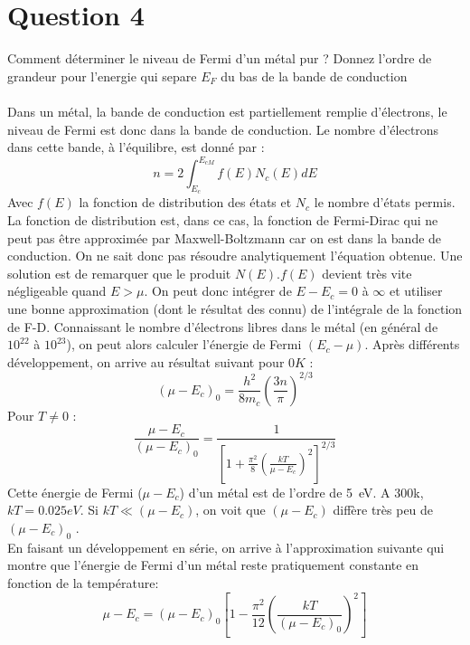\section{Question 4}
Comment déterminer le niveau de Fermi d’un métal pur ?  Donnez l'ordre de grandeur pour l'energie qui separe $E_F$ du bas de la bande de conduction\\
\hbox{}
\\
Dans un métal, la bande de conduction est partiellement remplie d'électrons, le niveau de Fermi est donc dans la bande de conduction. Le nombre d'électrons dans cette bande, à l'équilibre, est donné par :
\begin{equation}
n=2\int_{E_c}^{E_{cM}} f(E)N_c(E)dE 
\end{equation} 
Avec $f(E)$ la fonction de distribution des états et $N_c$ le nombre d'états permis. La fonction de distribution est, dans ce cas, la fonction de Fermi-Dirac qui ne peut pas être approximée par Maxwell-Boltzmann car on est dans la bande de conduction. On ne sait donc pas résoudre analytiquement l'équation obtenue. Une solution est de remarquer que le produit $N(E).f(E)$ devient très vite négligeable quand $E>\mu$. On peut donc intégrer de  $E-E_c = 0$ à $\infty$ et utiliser une bonne approximation (dont le résultat des connu) de l'intégrale de la fonction de F-D.%
Connaissant le nombre d'électrons libres dans le métal (en général de $10^{22}$ à $10^{23}$), on peut alors calculer l'énergie de Fermi $(E_c-\mu)$. Après différents développement, on arrive au résultat suivant pour $0K$ :
\begin{equation}
(\mu -E_c)_0=\frac{h^2}{8m_c} (\frac{3n}{\pi})^{2/3}
\end{equation}
Pour $T \neq 0$ :
\begin{equation}
\frac{\mu -E_c}{(\mu - E_c)_0} = \frac{1}{\left[ 1 + \frac{\pi^2}{8} \left( \frac{kT}{\mu - E_c} \right)^2 \right]^{2/3}}
\end{equation}
Cette énergie de Fermi ($\mu -E_c$) d'un métal est de l'ordre de 5~eV. A 300k, $kT = 0.025 eV$. Si $kT \ll (\mu - E_c)$, on voit que $(\mu - E_c)$ diffère très peu de $(\mu - E_c)_0$ . \\

En faisant un développement en série, on arrive à l'approximation suivante qui montre que l'énergie de Fermi d'un métal reste pratiquement constante en fonction de la température:
$$ \mu - E_c = (\mu - E_c)_0 \left[ 1 - \frac{\pi^2}{12} \left( \frac{kT}{(\mu - E_c)_0}\right)^2 \right]$$

